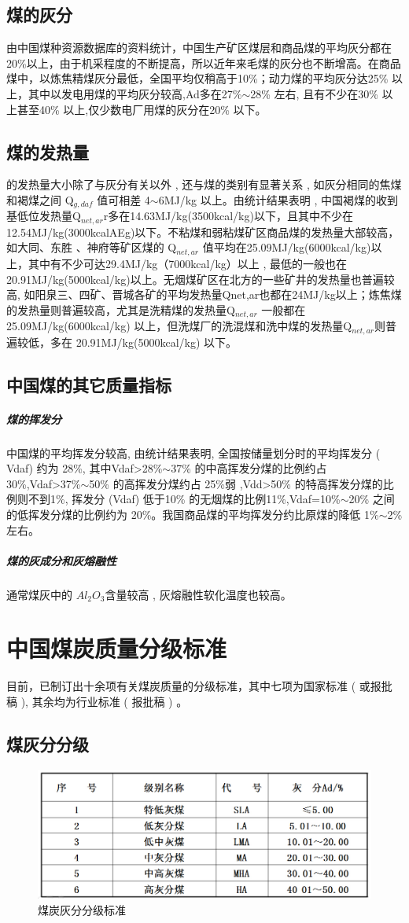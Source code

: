 \documentclass[10pt,openany]{ctexbook}
\begin{document}
  \subsection{煤的灰分} 由中国煤种资源数据库的资料统计，中国生产矿区煤层和商品煤的平均灰分都在20\%以上，由于机采程度的不断提高，所以近年来毛煤的灰分也不断增高。在商品煤中，以炼焦精煤灰分最低，全国平均仅稍高于10\%；动力煤的平均灰分达25\% 以上，其中以发电用煤的平均灰分较高,Ad多在27\%$\sim$28\% 左右, 且有不少在30\% 以上甚至40\% 以上,仅少数电厂用煤的灰分在20\% 以下。
  \subsection{煤的发热量}
  的发热量大小除了与灰分有关以外 , 还与煤的类别有显著关系 , 如灰分相同的焦煤和褐煤之间 Q$_{g,daf}$ 值可相差 4$\sim$6MJ/kg 以上。由统计结果表明 , 中国褐煤的收到基低位发热量Q$_{net,ar}$r多在14.63MJ/kg(3500kcal/kg)以下，且其中不少在12.54MJ/kg(3000kcalAEg)以下。不粘煤和弱粘煤矿区商品煤的发热量大部较高，如大同、东胜 、神府等矿区煤的 Q$_{net,ar}$ 值平均在25.09MJ/kg(6000kcal/kg)以上，其中有不少可达29.4MJ/kg（7000kcal/kg）以上 , 最低的一般也在 20.91MJ/kg(5000kcal/kg)以上。无烟煤矿区在北方的一些矿井的发热量也普遍较高, 如阳泉三、四矿、晋城各矿的平均发热量Qnet,ar也都在24MJ/kg以上；炼焦煤的发热量则普遍较高，尤其是洗精煤的发热量Q$_{net,ar}$ 一般都在 25.09MJ/kg(6000kcal/kg) 以上，但洗煤厂的洗混煤和洗中煤的发热量Q$_{net,ar}$则普遍较低，多在 20.91MJ/kg(5000kcal/kg) 以下。
\subsection{中国煤的其它质量指标}
\subparagraph{煤的挥发分} 中国煤的平均挥发分较高, 由统计结果表明, 全国按储量划分时的平均挥发分 ( Vdaf) 约为 28\%, 其中Vdaf>28\%$\sim$37\% 的中高挥发分煤的比例约占 30\%,Vdaf>37\%$\sim$50\% 的高挥发分煤约占 25\%弱 ,Vdd>50\% 的特高挥发分煤的比例则不到1\%, 挥发分 (Vdaf) 低于10\% 的无烟煤的比例11\%,Vdaf=10\%$\sim$20\% 之间的低挥发分煤的比例约为 20\%。我国商品煤的平均挥发分约比原煤的降低 1\%$\sim$2\% 左右。
\subparagraph{煤的灰成分和灰熔融性}
通常煤灰中的 $Al_2O_3$含量较高 , 灰熔融性软化温度也较高。
\section{中国煤炭质量分级标准}
目前，已制订出十余项有关煤炭质量的分级标准，其中七项为国家标准 ( 或报批稿 ), 其余均为行业标准 ( 报批稿 ) 。
\subsection{煤灰分分级}
 \begin{figure}[!ht]
\includegraphics[scale=0.6]{7}
\caption{煤炭灰分分级标准 }
\end{figure}
\end{document}
